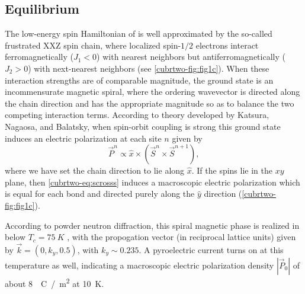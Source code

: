 \subsection{Equilibrium}
The low-energy spin Hamiltonian of  is well approximated by the so-called frustrated \oned XXZ spin chain, where localized spin-$1/2$ electrons interact ferromagnetically ($J_1 < 0$) with nearest neighbors but antiferromagnetically ($J_2 > 0$) with next-nearest neighbors (see \cref{cubrtwo-fig:fig1c}).
When these interaction strengths are of comparable magnitude, the ground state is an incommensurate magnetic spiral, where the ordering wavevector is directed along the chain direction and has the appropriate magnitude so as to balance the two competing interaction terms.
According to theory developed by Katsura, Nagaosa, and Balatsky\cite{katsura_spin_2005}, when spin-orbit coupling is strong this ground state induces an electric polarization at each site $n$ given by
\begin{equation}\label{cubrtwo-eq:scrosss}
\vec{P}^n \propto \hat{x}\times(\vec{S}^{n} \times \vec{S}^{n+1}),
\end{equation}
where we have set the chain direction to lie along $\hat{x}$.
If the spins lie in the $xy$ plane, then \cref{cubrtwo-eq:scrosss} induces a macroscopic electric polarization which is equal for each bond and directed purely along the $\hat{y}$ direction (\cref{cubrtwo-fig:fig1c}).

According to powder neutron diffraction, this spiral magnetic phase is realized in  below $T_c=\qty{75}{K}$ \cite{zhao_cubr2_2012,wang_nmr_2018,zhao_pressure_2019,
zhang_giant_2020}, with the propogation vector (in reciprocal lattice units) given by $\vec{k} = (0, k_y, 0.5)$, with $k_y\sim 0.235$\cite{zhao_cubr2_2012,lee_investigation_2012}.
A pyroelectric current turns on at this temperature as well, indicating a macroscopic electric polarization density $|\vec{P}_0|$ of about \qty{8}{\mu C / m^2} at \qty{10}{K}\cite{zhao_cubr2_2012}.

